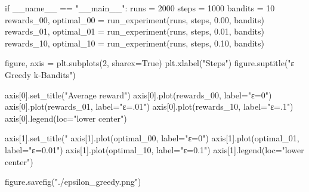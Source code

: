 \documentclass{article}
\begin{document}
\begin{python}
if __name__ == "__main__":
    runs = 2000
    steps = 1000
    bandits = 10
    rewards_00, optimal_00 = run_experiment(runs, steps, 0.00, bandits)
    rewards_01, optimal_01 = run_experiment(runs, steps, 0.01, bandits)
    rewards_10, optimal_10 = run_experiment(runs, steps, 0.10, bandits)

    figure, axis = plt.subplots(2, sharex=True)
    plt.xlabel("Steps")
    figure.suptitle("ε Greedy k-Bandits")

    axis[0].set_title("Average reward")
    axis[0].plot(rewards_00, label="ε=0")
    axis[0].plot(rewards_01, label="ε=.01")
    axis[0].plot(rewards_10, label="ε=.1")
    axis[0].legend(loc="lower center")

    axis[1].set_title("%
    axis[1].plot(optimal_00, label="ε=0")
    axis[1].plot(optimal_01, label="ε=0.01")
    axis[1].plot(optimal_10, label="ε=0.1")
    axis[1].legend(loc="lower center")

    figure.savefig("./epsilon_greedy.png")

\end{python}
\end{document}
